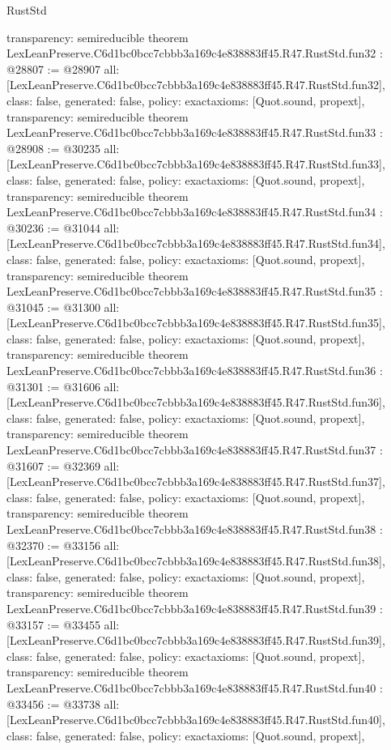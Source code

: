 \begin{lexlean}{RustStd}
\begin{coremodule}
{  transparency: semireducible
}
theorem LexLeanPreserve.C6d1bc0bcc7cbbb3a169c4e838883ff45.R47.RustStd.fun32 : @28807 := @28907 {
  all: [LexLeanPreserve.C6d1bc0bcc7cbbb3a169c4e838883ff45.R47.RustStd.fun32],
  class: false,
  generated: false,
  policy: exact{axioms: [Quot.sound, propext]},
  transparency: semireducible
}
theorem LexLeanPreserve.C6d1bc0bcc7cbbb3a169c4e838883ff45.R47.RustStd.fun33 : @28908 := @30235 {
  all: [LexLeanPreserve.C6d1bc0bcc7cbbb3a169c4e838883ff45.R47.RustStd.fun33],
  class: false,
  generated: false,
  policy: exact{axioms: [Quot.sound, propext]},
  transparency: semireducible
}
theorem LexLeanPreserve.C6d1bc0bcc7cbbb3a169c4e838883ff45.R47.RustStd.fun34 : @30236 := @31044 {
  all: [LexLeanPreserve.C6d1bc0bcc7cbbb3a169c4e838883ff45.R47.RustStd.fun34],
  class: false,
  generated: false,
  policy: exact{axioms: [Quot.sound, propext]},
  transparency: semireducible
}
theorem LexLeanPreserve.C6d1bc0bcc7cbbb3a169c4e838883ff45.R47.RustStd.fun35 : @31045 := @31300 {
  all: [LexLeanPreserve.C6d1bc0bcc7cbbb3a169c4e838883ff45.R47.RustStd.fun35],
  class: false,
  generated: false,
  policy: exact{axioms: [Quot.sound, propext]},
  transparency: semireducible
}
theorem LexLeanPreserve.C6d1bc0bcc7cbbb3a169c4e838883ff45.R47.RustStd.fun36 : @31301 := @31606 {
  all: [LexLeanPreserve.C6d1bc0bcc7cbbb3a169c4e838883ff45.R47.RustStd.fun36],
  class: false,
  generated: false,
  policy: exact{axioms: [Quot.sound, propext]},
  transparency: semireducible
}
theorem LexLeanPreserve.C6d1bc0bcc7cbbb3a169c4e838883ff45.R47.RustStd.fun37 : @31607 := @32369 {
  all: [LexLeanPreserve.C6d1bc0bcc7cbbb3a169c4e838883ff45.R47.RustStd.fun37],
  class: false,
  generated: false,
  policy: exact{axioms: [Quot.sound, propext]},
  transparency: semireducible
}
theorem LexLeanPreserve.C6d1bc0bcc7cbbb3a169c4e838883ff45.R47.RustStd.fun38 : @32370 := @33156 {
  all: [LexLeanPreserve.C6d1bc0bcc7cbbb3a169c4e838883ff45.R47.RustStd.fun38],
  class: false,
  generated: false,
  policy: exact{axioms: [Quot.sound, propext]},
  transparency: semireducible
}
theorem LexLeanPreserve.C6d1bc0bcc7cbbb3a169c4e838883ff45.R47.RustStd.fun39 : @33157 := @33455 {
  all: [LexLeanPreserve.C6d1bc0bcc7cbbb3a169c4e838883ff45.R47.RustStd.fun39],
  class: false,
  generated: false,
  policy: exact{axioms: [Quot.sound, propext]},
  transparency: semireducible
}
theorem LexLeanPreserve.C6d1bc0bcc7cbbb3a169c4e838883ff45.R47.RustStd.fun40 : @33456 := @33738 {
  all: [LexLeanPreserve.C6d1bc0bcc7cbbb3a169c4e838883ff45.R47.RustStd.fun40],
  class: false,
  generated: false,
  policy: exact{axioms: [Quot.sound, propext]},
}
\end{coremodule}
\end{lexlean}

